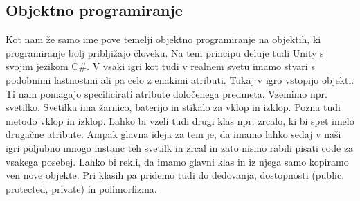 {\color{indiagreen}\subsection{Objektno programiranje}}
Kot nam že samo ime pove temelji objektno programiranje na objektih, ki programiranje bolj pribljižajo človeku. Na tem principu deluje tudi Unity s svojim jezikom C\#. V vsaki igri kot tudi v realnem svetu imamo stvari s podobnimi lastnostmi ali pa celo z enakimi atributi. Tukaj v igro vstopijo objekti. Ti nam pomagajo specificirati atribute določenega predmeta. Vzemimo npr. svetilko. Svetilka ima žarnico, baterijo in stikalo za vklop in izklop. Pozna tudi metodo vklop in izklop. Lahko bi vzeli tudi drugi klas npr. zrcalo, ki bi spet imelo drugačne atribute. Ampak glavna ideja za tem je, da imamo lahko sedaj v naši igri poljubno mnogo instanc teh svetilk in zrcal in zato nismo rabili pisati code za vsakega posebej. Lahko bi rekli, da imamo glavni klas in iz njega samo kopiramo ven nove objekte. Pri klasih pa pridemo tudi do dedovanja, dostopnosti (public, protected, private) in polimorfizma.